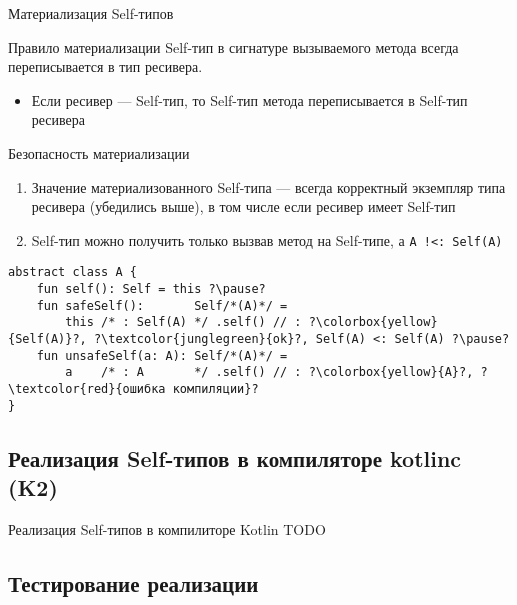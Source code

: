 \documentclass[handout,aspectratio=169,usenames,dvipsnames]{beamer}
\begin{document}
    \begin{frame}[fragile]{Материализация Self-типов}
        \begin{block}{Правило материализации}
            Self-тип в сигнатуре вызываемого метода всегда переписывается в тип ресивера.
            \begin{itemize}
                \item Если ресивер --- Self-тип, то Self-тип метода переписывается в Self-тип ресивера
            \end{itemize}
        \end{block}
        \pause
        \begin{block}{Безопасность материализации}
            \begin{enumerate}
                \item Значение материализованного Self-типа --- всегда корректный экземпляр типа ресивера (убедились выше), в том числе если ресивер имеет Self-тип
                \item Self-тип можно получить только вызвав метод на Self-типе, а \texttt{A !<: Self(A)}
            \end{enumerate} \pause
            \begin{verbatim}
abstract class A {
    fun self(): Self = this ?\pause?
    fun safeSelf():       Self/*(A)*/ =
        this /* : Self(A) */ .self() // : ?\colorbox{yellow}{Self(A)}?, ?\textcolor{junglegreen}{ok}?, Self(A) <: Self(A) ?\pause?
    fun unsafeSelf(a: A): Self/*(A)*/ =
        a    /* : A       */ .self() // : ?\colorbox{yellow}{A}?, ?\textcolor{red}{ошибка компиляции}?
}
            \end{verbatim}
        \end{block}
    \end{frame}

    \subsection{Реализация Self-типов в компиляторе kotlinc (K2)}

    \begin{frame}{Реализация Self-типов в компилиторе Kotlin}
        TODO %
    \end{frame}

    \subsection{Тестирование реализации}
\end{document}
